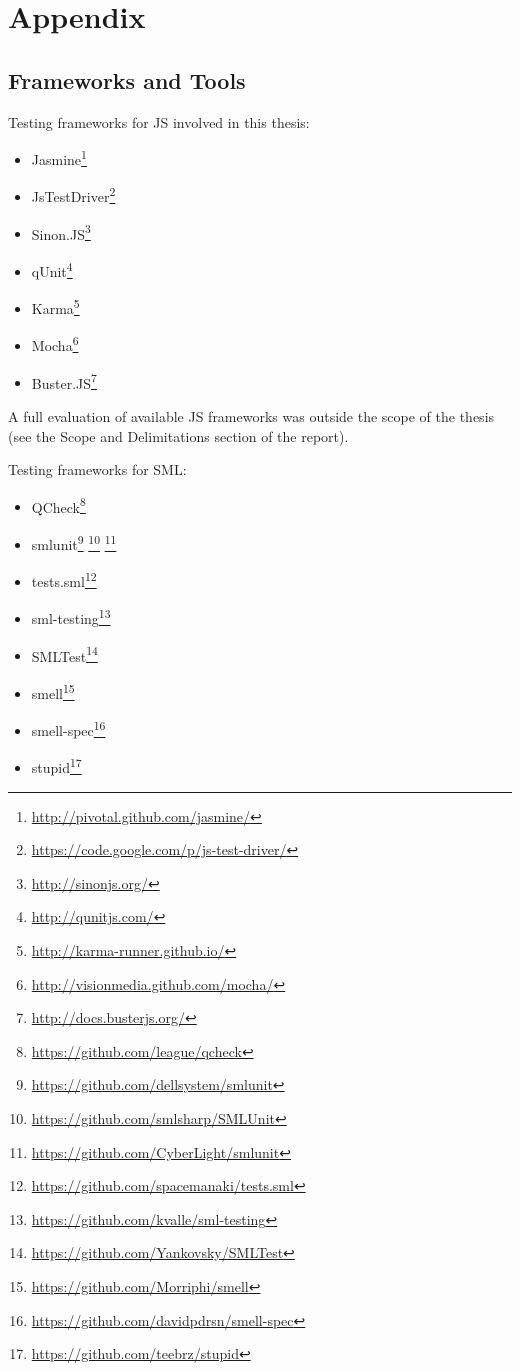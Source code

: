 \documentclass[11pt]{article}
\begin{document}
\section*{Appendix}

\subsection*{Frameworks and Tools}

Testing frameworks for JS involved in this thesis:
\begin{itemize}[label={--}]
\item Jasmine\footnote{\url{http://pivotal.github.com/jasmine/}}
\item JsTestDriver\footnote{\url{https://code.google.com/p/js-test-driver/}}
\item Sinon.JS\footnote{\url{http://sinonjs.org/}}
\item qUnit\footnote{\url{http://qunitjs.com/}}
\item Karma\footnote{\url{http://karma-runner.github.io/}}
\item Mocha\footnote{\url{http://visionmedia.github.com/mocha/}}
\item Buster.JS\footnote{\url{http://docs.busterjs.org/}}
\end{itemize}

A full evaluation of available JS frameworks was outside the scope of the thesis (see the Scope and Delimitations section of the report).

Testing frameworks for SML:
\begin{itemize}[label={--}]
\item QCheck\footnote{\url{https://github.com/league/qcheck}}
\item smlunit\footnote{\url{https://github.com/dellsystem/smlunit}}
\footnote{\url{https://github.com/smlsharp/SMLUnit}}
\footnote{\url{https://github.com/CyberLight/smlunit}}
\item tests.sml\footnote{\url{https://github.com/spacemanaki/tests.sml}}
\item sml-testing\footnote{\url{https://github.com/kvalle/sml-testing}}
\item SMLTest\footnote{\url{https://github.com/Yankovsky/SMLTest}}
\item smell\footnote{\url{https://github.com/Morriphi/smell}}
\item smell-spec\footnote{\url{https://github.com/davidpdrsn/smell-spec}}
\item stupid\footnote{\url{https://github.com/teebrz/stupid}}
\end{itemize}
\end{document}
